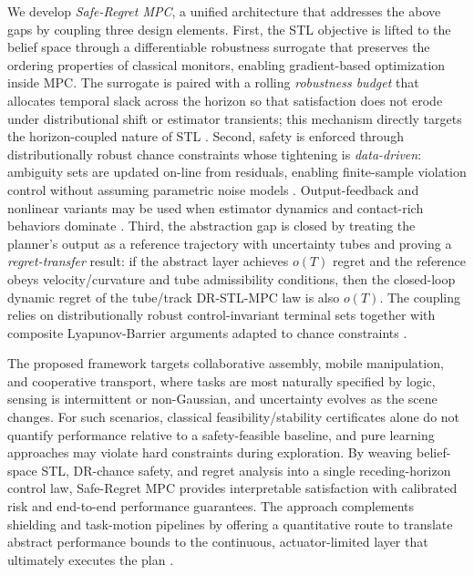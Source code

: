 \documentclass[journal]{IEEEtran}
\theoremstyle{definition}
\begin{document}
 
We develop \emph{Safe-Regret MPC}, a unified architecture that addresses the above gaps by coupling three design elements. First, the STL objective is lifted to the belief space through a differentiable robustness surrogate that preserves the ordering properties of classical monitors, enabling gradient-based optimization inside MPC. The surrogate is paired with a rolling \emph{robustness budget} that allocates temporal slack across the horizon so that satisfaction does not erode under distributional shift or estimator transients; this mechanism directly targets the horizon-coupled nature of STL \cite{Yu2024Automatica_STL_MPM}. Second, safety is enforced through distributionally robust chance constraints whose tightening is \emph{data-driven}: ambiguity sets are updated on-line from residuals, enabling finite-sample violation control without assuming parametric noise models \cite{Coulson2020TAC_DeePC_DR}. Output-feedback and nonlinear variants may be used when estimator dynamics and contact-rich behaviors dominate \cite{Zhao2023Automatica_DRMPC_OF}. Third, the abstraction gap is closed by treating the planner's output as a reference trajectory with uncertainty tubes and proving a \emph{regret-transfer} result: if the abstract layer achieves \(o(T)\) regret and the reference obeys velocity/curvature and tube admissibility conditions, then the closed-loop dynamic regret of the tube/track DR-STL-MPC law is also \(o(T)\). The coupling relies on distributionally robust control-invariant terminal sets together with composite Lyapunov-Barrier arguments adapted to chance constraints \cite{Clark2021Automatica_StochCBF,Nishimura2024TAC_StochCBF}.

 
The proposed framework targets collaborative assembly, mobile manipulation, and cooperative transport, where tasks are most naturally specified by logic, sensing is intermittent or non-Gaussian, and uncertainty evolves as the scene changes. For such scenarios, classical feasibility/stability certificates alone do not quantify performance relative to a safety-feasible baseline, and pure learning approaches may violate hard constraints during exploration. By weaving belief-space STL, DR-chance safety, and regret analysis into a single receding-horizon control law, Safe-Regret MPC provides interpretable satisfaction with calibrated risk and end-to-end performance guarantees. The approach complements shielding and task-motion pipelines by offering a quantitative route to translate abstract performance bounds to the continuous, actuator-limited layer that ultimately executes the plan \cite{Sutton2023TRO_ShieldedControl,Pan2024TRO_TMP}.
\end{document}
